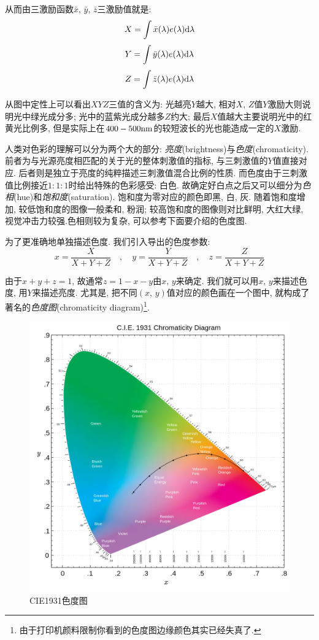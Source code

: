 从而由三激励函数$\bar{x},\,\bar{y},\,\bar{z}$三激励值就是:
\[X=\int \bar{x}(\lambda)e(\lambda)\textrm{d} \lambda\]
\[Y=\int \bar{y}(\lambda)e(\lambda)\textrm{d} \lambda\]
\[Z=\int \bar{z}(\lambda)e(\lambda)\textrm{d} \lambda\]

从图中定性上可以看出$XYZ$三值的含义为: 光越亮$Y$越大, 相对$X,\,Z$值$Y$激励大则说明光中绿光成分多; 光中的蓝紫光成分越多$Z$约大; 最后$X$值越大主要说明光中的红黄光比例多, 但是实际上在$400-500{\rm nm}$的较短波长的光也能造成一定的$X$激励.

人类对色彩的理解可以分为两个大的部分: \emph{亮度}(brightness)与\emph{色度}(chromaticity). 前者为与光源亮度相匹配的关于光的整体刺激值的指标, 与三刺激值的$Y$值直接对应. 后者则是独立于亮度的纯粹描述三刺激值混合比例的性质. 而色度由于三刺激值比例接近$1:1:1$时给出特殊的色彩感受: 白色. 故确定好白点之后又可以细分为\emph{色相}(hue)和\emph{饱和度}(saturation). 饱和度为零对应的颜色即黑, 白, 灰. 随着饱和度增加, 较低饱和度的图像一般柔和, 粉润; 较高饱和度的图像则对比鲜明, 大红大绿, 视觉冲击力较强.色相则较为复杂, 可以参考下面要介绍的色度图.

为了更准确地单独描述色度. 我们引入导出的色度参数:
\[x=\frac{X}{X+Y+Z}\quad ,\quad y=\frac{Y}{X+Y+Z}\quad ,\quad z=\frac{Z}{X+Y+Z}\]

由于$x+y+z=1$, 故通常$z=1-x-y$由$x,\,y$来确定. 我们就可以用$x,\,y$来描述色度, 用$Y$来描述亮度. 尤其是, 把不同$(x,\,y)$值对应的颜色画在一个图中, 就构成了著名的\emph{色度图}(chromaticity diagram)\footnote{由于打印机颜料限制你看到的色度图边缘颜色其实已经失真了.}. 

\begin{figure}[H]
\centering
\includegraphics[width=15cm]{image/5-8-4.png}
\caption{CIE1931色度图}
\end{figure}


